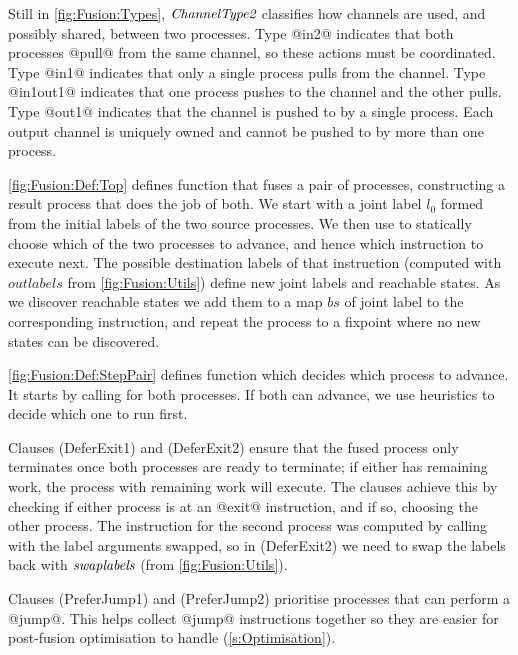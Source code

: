 Still in \autoref{fig:Fusion:Types}, $\textit{ChannelType2}$ classifies how channels are used, and possibly shared, between two processes.
Type @in2@ indicates that both processes @pull@ from the same channel, so these actions must be coordinated.
Type @in1@ indicates that only a single process pulls from the channel.
Type @in1out1@ indicates that one process pushes to the channel and the other pulls.
Type @out1@ indicates that the channel is pushed to by a single process.
Each output channel is uniquely owned and cannot be pushed to by more than one process.





\smallskip
\autoref{fig:Fusion:Def:Top} defines function  that fuses a pair of processes, constructing a result process that does the job of both. We start with a joint label $l_0$ formed from the initial labels of the two source processes. We then use  to statically choose which of the two processes to advance, and hence which instruction to execute next. The possible destination labels of that instruction (computed with $outlabels$ from \autoref{fig:Fusion:Utils}) define new joint labels and reachable states. As we discover reachable states we add them to a map $bs$ of joint label to the corresponding instruction, and repeat the process to a fixpoint where no new states can be discovered.



\autoref{fig:Fusion:Def:StepPair} defines function  which decides which process to advance. It starts by calling  for both processes. If both can advance, we use heuristics to decide which one to run first.

Clauses (DeferExit1) and (DeferExit2) ensure that the fused process only terminates once both processes are ready to terminate; if either has remaining work, the process with remaining work will execute.
The clauses achieve this by checking if either process is at an @exit@ instruction, and if so, choosing the other process.
The instruction for the second process was computed by calling  with the label arguments swapped, so in (DeferExit2) we need to swap the labels back with $\textit{swaplabels}$ (from \autoref{fig:Fusion:Utils}).

Clauses (PreferJump1) and (PreferJump2) prioritise processes that can perform a @jump@.
This helps collect @jump@ instructions together so they are easier for post-fusion optimisation to handle (\autoref{s:Optimisation}).

